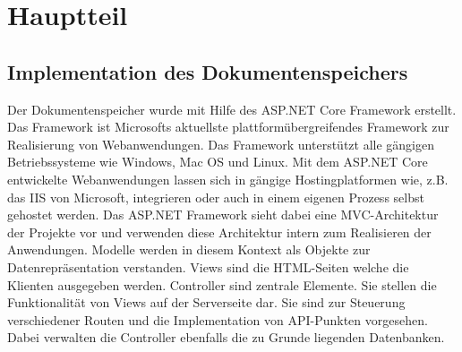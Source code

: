 \documentclass[
    fontsize=12pt,
    headings=small,
    parskip=half,           %
    bibliography=totoc,
    numbers=noenddot,       %
    open=any,               %
    ]{scrreprt}
\begin{document}
%


\chapter{Hauptteil}

\section{Implementation des Dokumentenspeichers}
Der Dokumentenspeicher wurde mit Hilfe des ASP.NET Core Framework erstellt. 
Das Framework ist Microsofts aktuellste plattformübergreifendes Framework zur Realisierung von Webanwendungen.
Das Framework unterstützt alle gängigen Betriebssysteme wie Windows, Mac OS und Linux.
Mit dem ASP.NET Core entwickelte Webanwendungen lassen sich in gängige Hostingplatformen wie, z.B. das IIS von Microsoft, integrieren oder auch in einem eigenen Prozess selbst gehostet werden. 
Das ASP.NET Framework sieht dabei eine MVC-Architektur der Projekte vor und verwenden diese Architektur intern zum Realisieren der Anwendungen. 
Modelle werden in diesem Kontext als Objekte zur Datenrepräsentation verstanden. 
Views sind die HTML-Seiten welche die Klienten ausgegeben werden.
Controller sind zentrale Elemente. 
Sie stellen die Funktionalität von Views auf der Serverseite dar.
Sie sind zur Steuerung verschiedener Routen und die Implementation von API-Punkten vorgesehen.
Dabei verwalten die Controller ebenfalls die zu Grunde liegenden Datenbanken.
\end{document}

